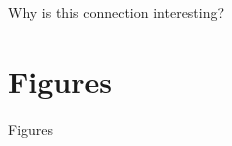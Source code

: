 \documentclass[8pt, t,
aspectratio=169,%
]{beamer}
\begin{document}
\begin{frame}{Why is this connection interesting?}
\end{frame}

\section{Figures}
\begin{frame}[allowframebreaks]{Figures}
    \begin{figure}
        
    \end{figure}

    \begin{figure}
        
    \end{figure}

    \begin{figure}
        
    \end{figure}
    
\end{frame}
\end{document}
